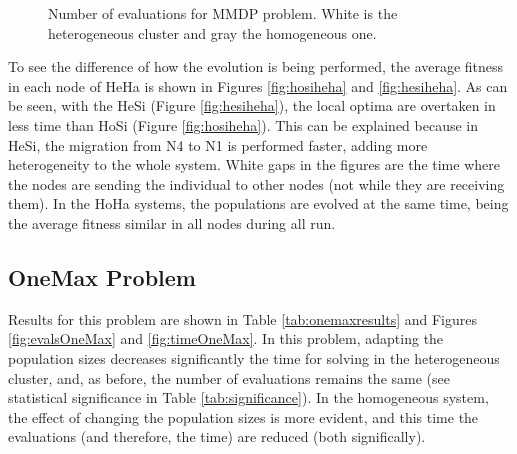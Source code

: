 \begin{figure}
\centering
{}
\caption{Number of evaluations for MMDP problem. White is the heterogeneous cluster and gray the homogeneous one.}
\label{fig:evalsMMDP}
\end{figure}

To see the difference of how the evolution is being performed, the average fitness in each node of HeHa is shown in Figures \ref{fig:hosiheha} and \ref{fig:hesiheha}. As can be seen, with the HeSi (Figure \ref{fig:hesiheha}), the local optima are overtaken in less time than HoSi (Figure \ref{fig:hosiheha}).  This can be explained because in HeSi, the migration from N4 to N1 is performed faster, adding more heterogeneity to the whole system. White gaps in the figures are the time where the nodes are sending the individual to other nodes (not while they are receiving them). In the HoHa systems, the populations are evolved at the same time, being the average fitness similar in all nodes during all run. %


\begin{figure*}
\centering
{}
\caption{Average fitness in the first 1000 milliseconds of execution of the four nodes of the heterogeneous cluster with the same population sizes (HoSi/HeHa) for the MMDP problem.}
\label{fig:hosiheha}
\end{figure*}

\begin{figure*}
\centering
{} %
\caption{Average fitness in the first 1000 milliseconds of execution of the four nodes of the heterogeneous cluster with different population sizes (HeSi/HeHa) for the MMDP problem.}
\label{fig:hesiheha}
\end{figure*}



\subsection{OneMax Problem}

Results for this problem are shown in Table \ref{tab:onemaxresults} and Figures \ref{fig:evalsOneMax} and \ref{fig:timeOneMax}. In this problem, adapting the population sizes decreases significantly the time for solving in the heterogeneous cluster, and, as before, the number of evaluations remains the same (see statistical significance in Table \ref{tab:significance}). In the homogeneous system, the effect of changing the population sizes is more evident, and this time the evaluations (and therefore, the time) are reduced (both significally). 

